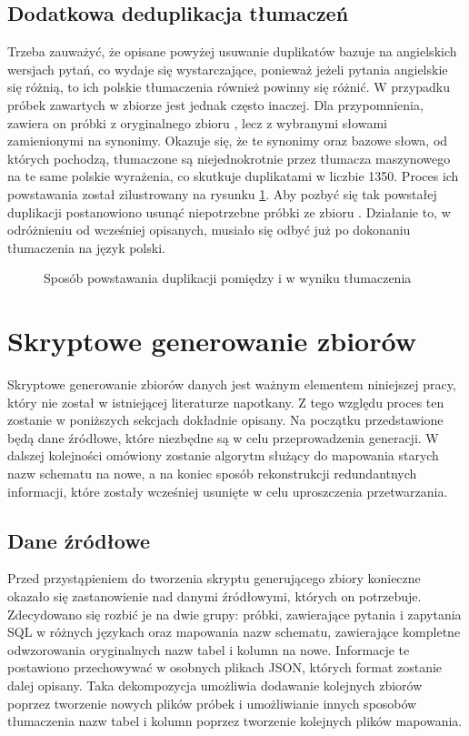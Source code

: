 \subsection{Dodatkowa deduplikacja tłumaczeń}
Trzeba zauważyć, że opisane powyżej usuwanie duplikatów bazuje na angielskich wersjach pytań, co wydaje się wystarczające, ponieważ jeżeli pytania angielskie się różnią, to ich polskie tłumaczenia również powinny się różnić. W przypadku próbek zawartych w zbiorze  jest jednak często inaczej. Dla przypomnienia, zawiera on próbki z oryginalnego zbioru , lecz z wybranymi słowami zamienionymi na synonimy. Okazuje się, że te synonimy oraz bazowe słowa, od których pochodzą, tłumaczone są niejednokrotnie przez tłumacza maszynowego na te same polskie wyrażenia, co skutkuje duplikatami w liczbie 1350. Proces ich powstawania został zilustrowany na rysunku \ref{fig:deduplication-after-translation}. Aby pozbyć się tak powstałej duplikacji postanowiono usunąć niepotrzebne próbki ze zbioru . Działanie to, w odróżnieniu od wcześniej opisanych, musiało się odbyć już po dokonaniu tłumaczenia na język polski.

\begin{figure}[ht!]
  \centering
  
  \caption[Sposób powstawania duplikacji w wyniku tłumaczenia]{Sposób powstawania duplikacji pomiędzy  i  w wyniku tłumaczenia}
  \label{fig:deduplication-after-translation}
\end{figure}

\section{Skryptowe generowanie zbiorów}
Skryptowe generowanie zbiorów danych jest ważnym elementem niniejszej pracy, który nie został w istniejącej literaturze napotkany. Z tego względu proces ten zostanie w poniższych sekcjach dokładnie opisany. Na początku przedstawione będą dane źródłowe, które niezbędne są w celu przeprowadzenia generacji. W dalszej kolejności omówiony zostanie algorytm służący do mapowania starych nazw schematu na nowe, a na koniec sposób rekonstrukcji redundantnych informacji, które zostały wcześniej usunięte w celu uproszczenia przetwarzania.

\subsection{Dane źródłowe}
Przed przystąpieniem do tworzenia skryptu generującego zbiory konieczne okazało się zastanowienie nad danymi źródłowymi, których on potrzebuje. Zdecydowano się rozbić je na dwie grupy: próbki, zawierające pytania i zapytania SQL w różnych językach oraz mapowania nazw schematu, zawierające kompletne odwzorowania oryginalnych nazw tabel i kolumn na nowe. Informacje te postawiono przechowywać w osobnych plikach JSON, których format zostanie dalej opisany. Taka dekompozycja umożliwia dodawanie kolejnych zbiorów poprzez tworzenie nowych plików próbek i umożliwianie innych sposobów tłumaczenia nazw tabel i kolumn poprzez tworzenie kolejnych plików mapowania.

